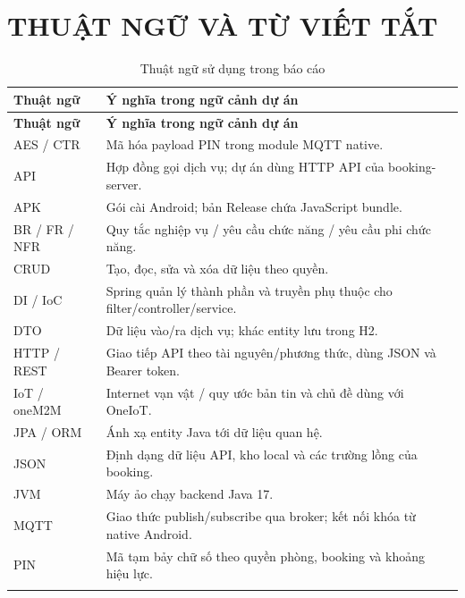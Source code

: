 \section*{THUẬT NGỮ VÀ TỪ VIẾT TẮT}
{\tabletext{}\renewcommand{\arraystretch}{1.04}
\begin{longtable}{>{\raggedright\arraybackslash}p{}>{\raggedright\arraybackslash}p{}}
\caption{Thuật ngữ sử dụng trong báo cáo}\\
\toprule\textbf{Thuật ngữ} & \textbf{Ý nghĩa trong ngữ cảnh dự án}\\\midrule
\endfirsthead
\toprule\textbf{Thuật ngữ} & \textbf{Ý nghĩa trong ngữ cảnh dự án}\\\midrule
\endhead
\bottomrule\endlastfoot
AES / CTR & Mã hóa payload PIN trong module MQTT native.\\\addlinespace[1.5pt]
API & Hợp đồng gọi dịch vụ; dự án dùng HTTP API của booking-server.\\\addlinespace[1.5pt]
APK & Gói cài Android; bản Release chứa JavaScript bundle.\\\addlinespace[1.5pt]
BR / FR / NFR & Quy tắc nghiệp vụ / yêu cầu chức năng / yêu cầu phi chức năng.\\\addlinespace[1.5pt]
CRUD & Tạo, đọc, sửa và xóa dữ liệu theo quyền.\\\addlinespace[1.5pt]
DI / IoC & Spring quản lý thành phần và truyền phụ thuộc cho filter/controller/service.\\\addlinespace[1.5pt]
DTO & Dữ liệu vào/ra dịch vụ; khác entity lưu trong H2.\\\addlinespace[1.5pt]
HTTP / REST & Giao tiếp API theo tài nguyên/phương thức, dùng JSON và Bearer token.\\\addlinespace[1.5pt]
IoT / oneM2M & Internet vạn vật / quy ước bản tin và chủ đề dùng với OneIoT.\\\addlinespace[1.5pt]
JPA / ORM & Ánh xạ entity Java tới dữ liệu quan hệ.\\\addlinespace[1.5pt]
JSON & Định dạng dữ liệu API, kho local và các trường lồng của booking.\\\addlinespace[1.5pt]
JVM & Máy ảo chạy backend Java 17.\\\addlinespace[1.5pt]
MQTT & Giao thức publish/subscribe qua broker; kết nối khóa từ native Android.\\\addlinespace[1.5pt]
PIN & Mã tạm bảy chữ số theo quyền phòng, booking và khoảng hiệu lực.\\\addlinespace[1.5pt]

\end{longtable}}
